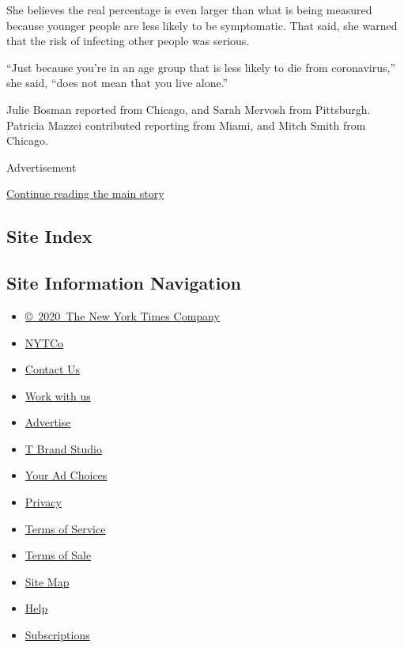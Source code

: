 She believes the real percentage is even larger than what is being
measured because younger people are less likely to be symptomatic. That
said, she warned that the risk of infecting other people was serious.

``Just because you're in an age group that is less likely to die from
coronavirus,'' she said, ``does not mean that you live alone.''

Julie Bosman reported from Chicago, and Sarah Mervosh from Pittsburgh.
Patricia Mazzei contributed reporting from Miami, and Mitch Smith from
Chicago.

Advertisement

\protect\hyperlink{after-bottom}{Continue reading the main story}

\hypertarget{site-index}{%
\subsection{Site Index}\label{site-index}}

\hypertarget{site-information-navigation}{%
\subsection{Site Information
Navigation}\label{site-information-navigation}}

\begin{itemize}
\tightlist
\item
  \href{https://help.nytimes.com/hc/en-us/articles/115014792127-Copyright-notice}{©~2020~The
  New York Times Company}
\end{itemize}

\begin{itemize}
\tightlist
\item
  \href{https://www.nytco.com/}{NYTCo}
\item
  \href{https://help.nytimes.com/hc/en-us/articles/115015385887-Contact-Us}{Contact
  Us}
\item
  \href{https://www.nytco.com/careers/}{Work with us}
\item
  \href{https://nytmediakit.com/}{Advertise}
\item
  \href{http://www.tbrandstudio.com/}{T Brand Studio}
\item
  \href{https://www.nytimes.com/privacy/cookie-policy\#how-do-i-manage-trackers}{Your
  Ad Choices}
\item
  \href{https://www.nytimes.com/privacy}{Privacy}
\item
  \href{https://help.nytimes.com/hc/en-us/articles/115014893428-Terms-of-service}{Terms
  of Service}
\item
  \href{https://help.nytimes.com/hc/en-us/articles/115014893968-Terms-of-sale}{Terms
  of Sale}
\item
  \href{https://spiderbites.nytimes.com}{Site Map}
\item
  \href{https://help.nytimes.com/hc/en-us}{Help}
\item
  \href{https://www.nytimes.com/subscription?campaignId=37WXW}{Subscriptions}
\end{itemize}
